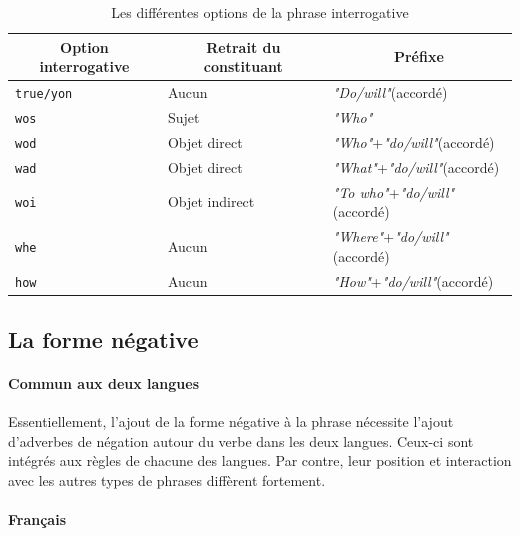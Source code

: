 \documentclass[11pt]{article} %
\newcommand{\real}[1]{\emph{#1}}
\begin{document}
\begin{table}[ht]
\centering
\caption{Les différentes options de la phrase interrogative}
\begin{tabular}{|l|l|l|}
\hline 
\multicolumn{1}{|c}{Option interrogative} & \multicolumn{1}{|c}{Retrait du constituant} & \multicolumn{1}{|c|}{Préfixe}\\
\hline 
\hline 
\texttt{true/yon} & Aucun & \real{"Do/will"}(accordé)\\
\hline 
\texttt{wos} & Sujet & \real{"Who"}\\
\hline 
\texttt{wod} & Objet direct & \real{"Who"}+\real{"do/will"}(accordé)\\
\hline 
\texttt{wad} & Objet direct & \real{"What"}+\real{"do/will"}(accordé)\\
\hline 
\texttt{woi} & Objet indirect & \real{"To who"}+\real{"do/will"}(accordé)\\
\hline 
\texttt{whe} & Aucun & \real{"Where"}+\real{"do/will"}(accordé)\\
\hline 
\texttt{how} & Aucun & \real{"How"}+\real{"do/will"}(accordé)\\
\hline 
\end{tabular}
\label{interroOptionsEn}
\end{table}

\subsection{La forme négative}

\paragraph{Commun aux deux langues}

Essentiellement, l'ajout de la forme négative à la phrase nécessite
l'ajout d'adverbes de négation autour du verbe dans les deux langues.
Ceux-ci sont
intégrés aux règles de chacune des langues. Par contre, leur position 
et interaction avec les autres types de phrases diffèrent fortement.

\paragraph{Français}
\end{document}

